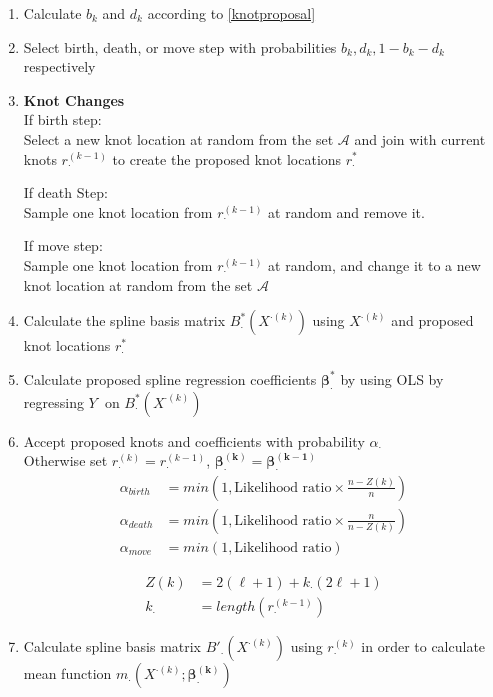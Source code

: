 \documentclass[11pt]{article}\usepackage[]{graphicx}\usepackage[]{color}
\begin{document}
\begin{enumerate}
\item
Calculate $b_k$ and $d_k$ according to \eqref{knotproposal} \\

\item
Select birth, death, or move step with probabilities $b_k,d_k,1-b_k-d_k$ respectively \\

\item
{\bf Knot Changes} \\
If birth step:\\
Select a new knot location at random from the set $\mathcal{A}$ and join with current knots $r_{\cdot}^{(k-1)}$ to create the proposed knot locations $r_{\cdot}^{*}$

If death Step:\\
Sample one knot location from $r_{\cdot}^{(k-1)}$ at random and remove it. 

If move step:\\
Sample one knot location from $r_{\cdot}^{(k-1)}$ at random, and change it to a new knot location at random from the set $\mathcal{A}$


\item
Calculate the spline basis matrix $B^*_{\cdot}(X^{\cdot(k)})$ using $X^{\cdot(k)}$ and proposed knot locations $r_{\cdot}^{*}$

\item
Calculate proposed spline regression coefficients $\boldsymbol{\beta^*_{\cdot}}$ by using OLS by regressing $Y^{\cdot}$ on $B^*_{\cdot}(X^{\cdot(k)})$

\item
Accept proposed knots and coefficients with probability $\alpha_{\cdot}$ \\

Otherwise set $r_{\cdot}^{(k)}=r_{\cdot}^{(k-1)}$, $\boldsymbol{\beta^{(k)}_{\cdot}} =\boldsymbol{\beta^{(k-1)}_{\cdot}}$\\

\begin{align*}
\alpha_{birth} &= min\left(1, \text{Likelihood ratio}\times \frac{n-Z(k)}{n} \right) \\
\alpha_{death} &= min\left(1, \text{Likelihood ratio}\times \frac{n}{n-Z(k)} \right) \\
\alpha_{move} &= min\left(1, \text{Likelihood ratio}\right) 
\end{align*}

\begin{align*}
Z(k) &= 2(\ell+1) + k_{\cdot}(2\ell+1) \\
k_{\cdot} &= length(r_{\cdot}^{(k-1)}) 
\end{align*}

\item
Calculate spline basis matrix $B'_{\cdot}(X^{\cdot(k)})$ using $r_{\cdot}^{(k)}$ in order to calculate mean function $m_{\cdot}(X^{\cdot(k)};\boldsymbol{\beta^{(k)}_{\cdot}})$


\end{enumerate}
\end{document}
